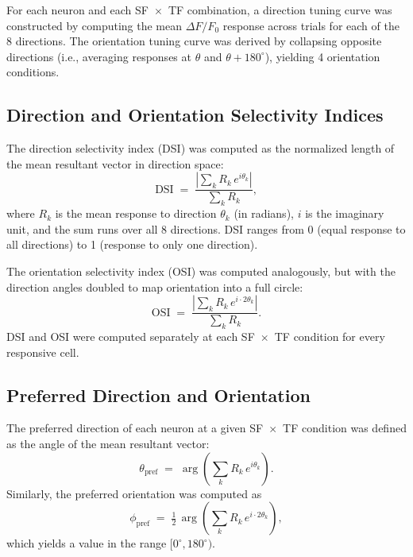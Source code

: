 \documentclass{brandeis-thesis3.3}
\begin{document}
For each neuron and each SF~$\times$~TF combination, a
direction tuning curve was constructed by computing the mean
$\Delta F/F_0$ response across trials for each of the 8
directions. The orientation tuning curve was derived by
collapsing opposite directions (i.e., averaging responses at
$\theta$ and $\theta + 180^\circ$), yielding 4 orientation
conditions.

\subsection{Direction and Orientation Selectivity Indices}

The direction selectivity index (DSI) was computed as the
normalized length of the mean resultant vector in direction
space:
%
\begin{equation}
  \text{DSI} \;=\;
    \frac{\left|\sum_{k} R_k \, e^{i\theta_k}\right|}
         {\sum_{k} R_k},
  \label{eq:dsi}
\end{equation}
%
where $R_k$ is the mean response to direction $\theta_k$ (in
radians), $i$ is the imaginary unit, and the sum runs over all
8 directions. DSI ranges from 0 (equal response to all
directions) to 1 (response to only one direction).

The orientation selectivity index (OSI) was computed
analogously, but with the direction angles doubled to map
orientation into a full circle:
%
\begin{equation}
  \text{OSI} \;=\;
    \frac{\left|\sum_{k} R_k \, e^{i \cdot 2\theta_k}\right|}
         {\sum_{k} R_k}.
  \label{eq:osi}
\end{equation}
%
DSI and OSI were computed separately at each SF~$\times$~TF
condition for every responsive cell.

\subsection{Preferred Direction and Orientation}

The preferred direction of each neuron at a given
SF~$\times$~TF condition was defined as the angle of the mean
resultant vector:
%
\begin{equation}
  \theta_{\text{pref}} \;=\;
    \arg\!\left(\sum_{k} R_k \, e^{i\theta_k}\right).
  \label{eq:prefdir}
\end{equation}
%
Similarly, the preferred orientation was computed as
%
\begin{equation}
  \phi_{\text{pref}} \;=\;
    \tfrac{1}{2}\,\arg\!\left(\sum_{k} R_k \,
      e^{i \cdot 2\theta_k}\right),
  \label{eq:prefori}
\end{equation}
%
which yields a value in the range $[0^\circ, 180^\circ)$.
\end{document}
